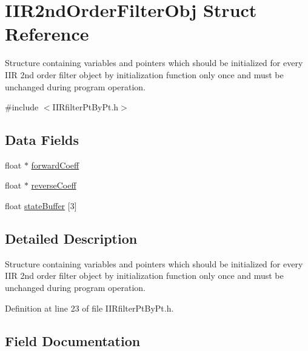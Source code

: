 \hypertarget{struct_i_i_r2nd_order_filter_obj}{}\section{I\+I\+R2nd\+Order\+Filter\+Obj Struct Reference}
\label{struct_i_i_r2nd_order_filter_obj}


Structure containing variables and pointers which should be initialized for every I\+IR 2nd order filter object by initialization function only once and must be unchanged during program operation.  




{\ttfamily \#include $<$I\+I\+Rfilter\+Pt\+By\+Pt.\+h$>$}

\subsection*{Data Fields}
\begin{DoxyCompactItemize}
\item 
float $\ast$ \mbox{\hyperlink{struct_i_i_r2nd_order_filter_obj_a8ce8a125811ae1ef41f12b57bda41654_a8ce8a125811ae1ef41f12b57bda41654}{forward\+Coeff}}
\item 
float $\ast$ \mbox{\hyperlink{struct_i_i_r2nd_order_filter_obj_a71cf702e70d0407aedf468a1d5f09242_a71cf702e70d0407aedf468a1d5f09242}{reverse\+Coeff}}
\item 
float \mbox{\hyperlink{struct_i_i_r2nd_order_filter_obj_a7a186ae4761a03abfb1fbb81c4916961_a7a186ae4761a03abfb1fbb81c4916961}{state\+Buffer}} \mbox{[}3\mbox{]}
\end{DoxyCompactItemize}


\subsection{Detailed Description}
Structure containing variables and pointers which should be initialized for every I\+IR 2nd order filter object by initialization function only once and must be unchanged during program operation. 

Definition at line 23 of file I\+I\+Rfilter\+Pt\+By\+Pt.\+h.



\subsection{Field Documentation}
\mbox{\label{struct_i_i_r2nd_order_filter_obj_a8ce8a125811ae1ef41f12b57bda41654_a8ce8a125811ae1ef41f12b57bda41654}} 
